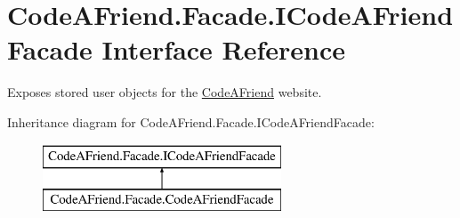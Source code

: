 \hypertarget{interface_code_a_friend_1_1_facade_1_1_i_code_a_friend_facade}{}\section{Code\+A\+Friend.\+Facade.\+I\+Code\+A\+Friend\+Facade Interface Reference}
\label{interface_code_a_friend_1_1_facade_1_1_i_code_a_friend_facade}


Exposes stored user objects for the \mbox{\hyperlink{namespace_code_a_friend}{Code\+A\+Friend}} website.  


Inheritance diagram for Code\+A\+Friend.\+Facade.\+I\+Code\+A\+Friend\+Facade\+:\begin{figure}[H]
\begin{center}
\leavevmode
\includegraphics[height=2.000000cm]{interface_code_a_friend_1_1_facade_1_1_i_code_a_friend_facade}
\end{center}
\end{figure}

